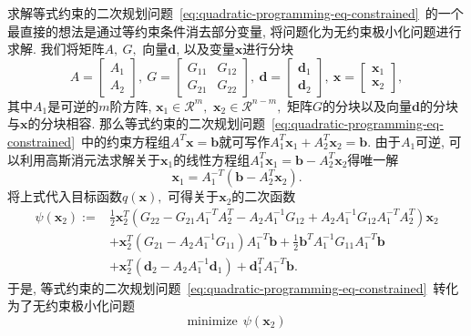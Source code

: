 \documentclass{SBCbookchapter}
\newcommand{\V}[1]{{\bm{#1}}}
\newcommand{\R}{\mathcal{R}}
\numberwithin{equation}{section}
\begin{document}
求解等式约束的二次规划问题~\eqref{eq:quadratic-programming-eq-constrained}~的一个最直接的想法是通过等约束条件消去部分变量, 将问题化为无约束极小化问题进行求解. 我们将矩阵$A, ~ G,$ 向量$\V{d}$, 以及变量$\V{x}$进行分块
\begin{equation}
\label{eq:quadratic-programming-eq-blocks}
A = \begin{bmatrix} A_1 \\ A_2 \end{bmatrix}, ~ G = \begin{bmatrix} G_{11} & G_{12} \\ G_{21} & G_{22} \end{bmatrix}, ~ \V{d} = \begin{bmatrix} \V{d}_1 \\ \V{d}_2 \end{bmatrix}, ~ \V{x} = \begin{bmatrix} \V{x}_1 \\ \V{x}_2 \end{bmatrix},
\end{equation}
其中$A_1$是可逆的$m$阶方阵, $\V{x}_1 \in \R^{m},$ $\V{x}_2 \in \R^{n-m},$ 矩阵$G$的分块以及向量$\V{d}$的分块与$\V{x}$的分块相容. 那么等式约束的二次规划问题~\eqref{eq:quadratic-programming-eq-constrained}~中的约束方程组$A^T \V{x} = \V{b}$就可写作$A_1^T \V{x}_1 + A_2^T \V{x}_2 = \V{b}.$ 由于$A_1$可逆, 可以利用高斯消元法求解关于$\V{x}_1$的线性方程组$A_1^T \V{x}_1 = \V{b} - A_2^T \V{x}_2$得唯一解
\begin{equation}
\label{eq:quadratic-programming-eq-constrained-subs}
\V{x}_1 = A_1^{-T} (\V{b} - A_2^T \V{x}_2).
\end{equation}
将上式代入目标函数$q(\V{x}),$ 可得关于$\V{x}_2$的二次函数
\begin{equation}
\begin{aligned}
\psi (\V{x}_2) := & \frac{1}{2} \V{x}_2^T \left( G_{22} - G_{21} A_1^{-T} A_2^T - A_2 A_1^{-1} G_{12} + A_2 A_1^{-1} G_{12} A_1^{-T} A_2^T \right) \V{x}_2 \\
& + \V{x}_2^T \left( G_{21} - A_2 A_1^{-1} G_{11} \right) A_1^{-T} \V{b} + \frac{1}{2} \V{b}^T A_1^{-1} G_{11} A_1^{-T} \V{b} \\
& + \V{x}_2^T \left( \V{d}_2 - A_2 A_1^{-1} \V{d}_1 \right) + \V{d}_1^T A_1^{-T} \V{b}.
\end{aligned}
\end{equation}
于是, 等式约束的二次规划问题~\eqref{eq:quadratic-programming-eq-constrained}~转化为了无约束极小化问题
\begin{equation*}
\text{minimize} ~~ \psi(\V{x}_2)
\end{equation*}
\end{document}
